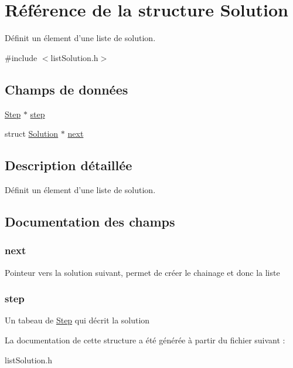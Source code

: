 \hypertarget{struct_solution}{\section{Référence de la structure Solution}
\label{struct_solution}
}


Définit un élement d'une liste de solution.  




{\ttfamily \#include $<$list\-Solution.\-h$>$}

\subsection*{Champs de données}
\begin{DoxyCompactItemize}
\item 
\hyperlink{struct_step}{Step} $\ast$ \hyperlink{struct_solution_ae5f3bfeb7e3cb5c8bc769d5504ebeeae}{step}
\item 
struct \hyperlink{struct_solution}{Solution} $\ast$ \hyperlink{struct_solution_acde7555eca71d1f823fbaf6f6a1f4670}{next}
\end{DoxyCompactItemize}


\subsection{Description détaillée}
Définit un élement d'une liste de solution. 

\subsection{Documentation des champs}
\hypertarget{struct_solution_acde7555eca71d1f823fbaf6f6a1f4670}{
\subsubsection[{next}]{\setlength{\rightskip}{0pt plus 5cm}next}}\label{struct_solution_acde7555eca71d1f823fbaf6f6a1f4670}
Pointeur vers la solution suivant, permet de créer le chainage et donc la liste \hypertarget{struct_solution_ae5f3bfeb7e3cb5c8bc769d5504ebeeae}{
\subsubsection[{step}]{\setlength{\rightskip}{0pt plus 5cm}step}}\label{struct_solution_ae5f3bfeb7e3cb5c8bc769d5504ebeeae}
Un tabeau de \hyperlink{struct_step}{Step} qui décrit la solution 

La documentation de cette structure a été générée à partir du fichier suivant \-:\begin{DoxyCompactItemize}
\item 
list\-Solution.\-h\end{DoxyCompactItemize}
